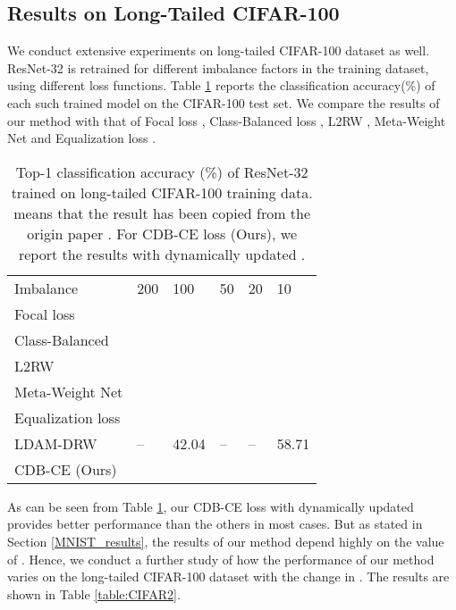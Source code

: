 \documentclass[runningheads]{llncs}
\begin{document}
\subsection{Results on Long-Tailed CIFAR-100}
We conduct extensive experiments on long-tailed CIFAR-100 dataset 
\cite{CIFAR,Class_balancedloss} as
well. ResNet-32 \cite{ResNet} is retrained for different imbalance factors in the 
training dataset, using different loss functions. Table \ref{table:CIFAR1} reports the 
classification accuracy(\%) of each such trained model on the CIFAR-100 test 
set. We compare the results of our method with that of Focal loss \cite{FOCALloss}, Class-Balanced loss \cite{Class_balancedloss}, L2RW \cite{reweighting_examples}, Meta-Weight Net \cite{Meta_net_weight} and Equalization loss \cite{Equalizationloss}.

\setlength{\tabcolsep}{4pt}
\begin{table}[tp]
\begin{center}
\caption{
Top-1 classification accuracy (\%) of ResNet-32 trained on long-tailed CIFAR-100
training data.  means that the result has been copied from the origin 
paper \cite{Class_balancedloss,Meta_net_weight,LDAM-DRW}. For CDB-CE loss 
(Ours), we report the results with dynamically updated .
}
\label{table:CIFAR1}
\begin{tabular}{llllll}
\hline\noalign{\smallskip}
Imbalance & 200 & 100 & 50 & 20 & 10\\
\noalign{\smallskip}
\hline
\noalign{\smallskip}
Focal loss  \cite{FOCALloss} & &  &  &  & \\
Class-Balanced  \cite{Class_balancedloss} & &  &  &  & \\
L2RW  \cite{reweighting_examples}& &  &  &  & \\
Meta-Weight Net  \cite{Meta_net_weight}& &  &  &  & \\
Equalization loss\footnotemark \footnotesize  \cite{Equalizationloss} & &  &  &  & \\
LDAM-DRW  \cite{LDAM-DRW} &  -- & 42.04 &   -- &  -- & 58.71\\
CDB-CE (Ours) & &  &  &  & \\
\hline
\end{tabular}
\end{center}
\end{table}
\setlength{\tabcolsep}{1.4pt}

As can be seen from Table \ref{table:CIFAR1}, our CDB-CE loss with dynamically 
updated  provides better performance than
the others in most cases. But as stated in Section \ref{MNIST_results}, the 
results of our method depend 
highly on the value of . Hence, we conduct a further study of how the 
performance of our method varies on the long-tailed CIFAR-100 dataset with the 
change in . The results are shown in Table \ref{table:CIFAR2}.
\end{document}
